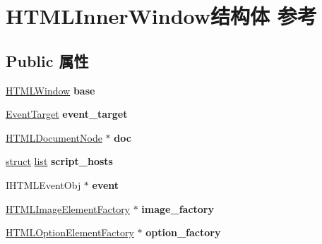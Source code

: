 \hypertarget{struct_h_t_m_l_inner_window}{}\section{H\+T\+M\+L\+Inner\+Window结构体 参考}
\label{struct_h_t_m_l_inner_window}
\subsection*{Public 属性}
\begin{DoxyCompactItemize}
\item 
\mbox{\label{struct_h_t_m_l_inner_window_a764490a97a386b5af044a3a25f601cf7}} 
\hyperlink{struct_h_t_m_l_window}{H\+T\+M\+L\+Window} {\bfseries base}
\item 
\mbox{\label{struct_h_t_m_l_inner_window_a8a49446e46cd71562bb8d0db145e2254}} 
\hyperlink{struct_event_target}{Event\+Target} {\bfseries event\+\_\+target}
\item 
\mbox{\label{struct_h_t_m_l_inner_window_a2c2bc4c064603d706575b9a128b691ec}} 
\hyperlink{struct_h_t_m_l_document_node}{H\+T\+M\+L\+Document\+Node} $\ast$ {\bfseries doc}
\item 
\mbox{\label{struct_h_t_m_l_inner_window_a9e39eeec120d22840f44c2a33e4401d3}} 
\hyperlink{interfacestruct}{struct} \hyperlink{classlist}{list} {\bfseries script\+\_\+hosts}
\item 
\mbox{\label{struct_h_t_m_l_inner_window_aef9f5404e36604055e670fc413b619de}} 
I\+H\+T\+M\+L\+Event\+Obj $\ast$ {\bfseries event}
\item 
\mbox{\label{struct_h_t_m_l_inner_window_abafba58351bc30e795c31c7e657bd0dc}} 
\hyperlink{struct_h_t_m_l_image_element_factory}{H\+T\+M\+L\+Image\+Element\+Factory} $\ast$ {\bfseries image\+\_\+factory}
\item 
\mbox{\label{struct_h_t_m_l_inner_window_a9ff20010cf379fe92802affe56f1d103}} 
\hyperlink{struct_h_t_m_l_option_element_factory}{H\+T\+M\+L\+Option\+Element\+Factory} $\ast$ {\bfseries option\+\_\+factory}

\end{DoxyCompactItemize}
